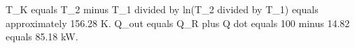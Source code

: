 T_K equals T_2 minus T_1 divided by ln(T_2 divided by T_1) equals approximately 156.28 K.  
Q_out equals Q_R plus Q dot equals 100 minus 14.82 equals 85.18 kW.